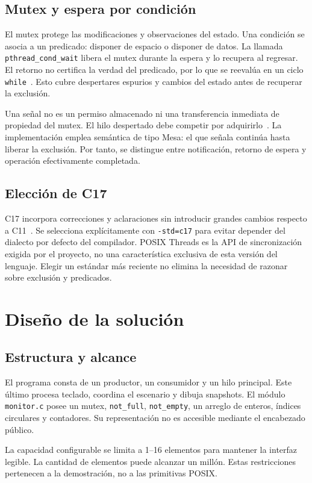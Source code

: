 \documentclass[conference]{IEEEtran}
\begin{document}
\subsection{Mutex y espera por condición}
El mutex protege las modificaciones y observaciones del estado. Una condición
se asocia a un predicado: disponer de espacio o disponer de datos. La llamada
\texttt{pthread\_cond\_wait} libera el mutex durante la espera y lo recupera al
regresar. El retorno no certifica la verdad del predicado, por lo que se reevalúa
en un ciclo \texttt{while}~\cite{wait}. Esto cubre despertares espurios y cambios
del estado antes de recuperar la exclusión.

Una señal no es un permiso almacenado ni una transferencia inmediata de propiedad
del mutex. El hilo despertado debe competir por adquirirlo~\cite{signal}. La
implementación emplea semántica de tipo Mesa: el que señala continúa hasta liberar
la exclusión. Por tanto, se distingue entre notificación, retorno de espera y
operación efectivamente completada.

\subsection{Elección de C17}
C17 incorpora correcciones y aclaraciones sin introducir grandes cambios respecto
a C11~\cite{gcc}. Se selecciona explícitamente con \texttt{-std=c17} para evitar
depender del dialecto por defecto del compilador. POSIX Threads es la API de
sincronización exigida por el proyecto, no una característica exclusiva de esta
versión del lenguaje. Elegir un estándar más reciente no elimina la necesidad de
razonar sobre exclusión y predicados.

\section{Diseño de la solución}
\subsection{Estructura y alcance}
El programa consta de un productor, un consumidor y un hilo principal. Este
último procesa teclado, coordina el escenario y dibuja snapshots. El módulo
\texttt{monitor.c} posee un mutex, \texttt{not\_full}, \texttt{not\_empty}, un arreglo
de enteros, índices circulares y contadores. Su representación no es accesible
mediante el encabezado público.

La capacidad configurable se limita a 1--16 elementos para mantener la interfaz
legible. La cantidad de elementos puede alcanzar un millón. Estas restricciones
pertenecen a la demostración, no a las primitivas POSIX.
\end{document}

